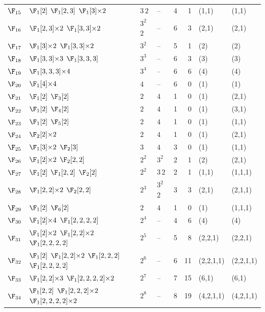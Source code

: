 \begin{landscape}
{\begin{longtable}{@{}l p{8.2cm} l l r r l l@{}}
$\F_{15}$ & $\F_{1}[2]$\; $\F_{1}[2,3]$\; $\F_{1}[3]{\times}2$ & $3$\,$2$ & -- & 4 & 1 & (1,1) & (1,1) \\
$\F_{16}$ & $\F_{1}[2,3]{\times}2$\; $\F_{1}[3,3]{\times}2$ & $3^{2}$\,$2$ & -- & 6 & 3 & (2,1) & (2,1) \\
$\F_{17}$ & $\F_{1}[3]{\times}2$\; $\F_{1}[3,3]{\times}2$ & $3^{2}$ & -- & 5 & 1 & (2) & (2) \\
$\F_{18}$ & $\F_{1}[3,3]{\times}3$\; $\F_{1}[3,3,3]$ & $3^{3}$ & -- & 6 & 3 & (3) & (3) \\
$\F_{19}$ & $\F_{1}[3,3,3]{\times}4$ & $3^{4}$ & -- & 6 & 6 & (4) & (4) \\
$\F_{20}$ & $\F_{1}[4]{\times}4$ & $4$ & -- & 6 & 0 & (1) & (1) \\
$\F_{21}$ & $\F_{1}[2]$\; $\F_{3}[2]$ & $2$ & $4$ & 1 & 0 & (1) & (2,1) \\
$\F_{22}$ & $\F_{1}[2]$\; $\F_{4}[2]$ & $2$ & $4$ & 1 & 0 & (1) & (3,1) \\
$\F_{23}$ & $\F_{1}[2]$\; $\F_{5}[2]$ & $2$ & $4$ & 1 & 0 & (1) & (1,1) \\
$\F_{24}$ & $\F_{2}[2]{\times}2$ & $2$ & $4$ & 1 & 0 & (1) & (2,1) \\
$\F_{25}$ & $\F_{1}[3]{\times}2$\; $\F_{2}[3]$ & $3$ & $4$ & 3 & 0 & (1) & (1,1) \\
$\F_{26}$ & $\F_{1}[2]{\times}2$\; $\F_{2}[2,2]$ & $2^{2}$ & $3^{2}$ & 2 & 1 & (2) & (2,1) \\
$\F_{27}$ & $\F_{1}[2]$\; $\F_{1}[2,2]$\; $\F_{2}[2]$ & $2^{2}$ & $3$\,$2$ & 2 & 1 & (1,1) & (1,1,1) \\
$\F_{28}$ & $\F_{1}[2,2]{\times}2$\; $\F_{2}[2,2]$ & $2^{3}$ & $3^{2}$\,$2$ & 3 & 3 & (2,1) & (2,1,1) \\
$\F_{29}$ & $\F_{1}[2]$\; $\F_{6}[2]$ & $2$ & $4$ & 1 & 0 & (1) & (1,1,1) \\
\midrule
$\F_{30}$ & $\F_{1}[2]{\times}4$\; $\F_{1}[2,2,2,2]$ & $2^{4}$ & -- & 4 & 6 & (4) & (4) \\
$\F_{31}$ & $\F_{1}[2]{\times}2$\; $\F_{1}[2,2]{\times}2$\; $\F_{1}[2,2,2,2]$ & $2^{5}$ & -- & 5 & 8 & (2,2,1) & (2,2,1) \\
$\F_{32}$ & $\F_{1}[2]$\; $\F_{1}[2,2]{\times}2$\; $\F_{1}[2,2,2]$\; $\F_{1}[2,2,2,2]$ & $2^{6}$ & -- & 6 & 11 & (2,2,1,1) & (2,2,1,1) \\
$\F_{33}$ & $\F_{1}[2,2]{\times}3$\; $\F_{1}[2,2,2,2]{\times}2$ & $2^{7}$ & -- & 7 & 15 & (6,1) & (6,1) \\
$\F_{34}$ & $\F_{1}[2,2]$\; $\F_{1}[2,2,2]{\times}2$\; $\F_{1}[2,2,2,2]{\times}2$ & $2^{8}$ & -- & 8 & 19 & (4,2,1,1) & (4,2,1,1) \\

\end{longtable}}
\end{landscape}
